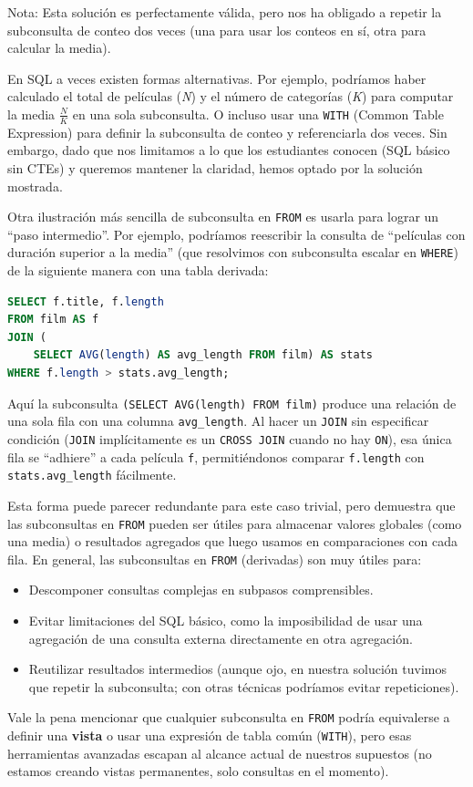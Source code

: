 \documentclass[12pt,a4paper]{article}
\begin{document}
Nota: Esta solución es perfectamente válida, pero nos ha obligado a repetir la subconsulta de conteo dos veces (una para usar los conteos en sí, otra para calcular la media).


En SQL a veces existen formas alternativas.
%
Por ejemplo, podríamos haber calculado el total de películas (\textit{N}) y el número de categorías (\textit{K}) para computar la media $\frac{N}{K}$ en una sola subconsulta.
%
O incluso usar una \texttt{WITH} (Common Table Expression) para definir la subconsulta de conteo y referenciarla dos veces.
%
Sin embargo, dado que nos limitamos a lo que los estudiantes conocen (SQL básico sin CTEs) y queremos mantener la claridad, hemos optado por la solución mostrada.


Otra ilustración más sencilla de subconsulta en \texttt{FROM} es usarla para lograr un “paso intermedio”.
%
Por ejemplo, podríamos reescribir la consulta de “películas con duración superior a la media” (que resolvimos con subconsulta escalar en \texttt{WHERE}) de la siguiente manera con una tabla derivada: 


\begin{lstlisting}[language=SQL]
SELECT f.title, f.length
FROM film AS f
JOIN (
	SELECT AVG(length) AS avg_length FROM film) AS stats
WHERE f.length > stats.avg_length;
\end{lstlisting}


Aquí la subconsulta \texttt{(SELECT AVG(length) FROM film)} produce una relación de una sola fila con una columna \texttt{avg\_length}.
%
Al hacer un \texttt{JOIN} sin especificar condición (\texttt{JOIN} implícitamente es un \texttt{CROSS JOIN} cuando no hay \texttt{ON}), esa única fila se “adhiere” a cada película \texttt{f}, permitiéndonos comparar \texttt{f.length} con \texttt{stats.avg\_length} fácilmente.

Esta forma puede parecer redundante para este caso trivial, pero demuestra que las subconsultas en \texttt{FROM} pueden ser útiles para almacenar valores globales (como una media) o resultados agregados que luego usamos en comparaciones con cada fila.
%
En general, las subconsultas en \texttt{FROM} (derivadas) son muy útiles para:



\begin{itemize}
\item Descomponer consultas complejas en subpasos comprensibles.
\item Evitar limitaciones del SQL básico, como la imposibilidad de usar una agregación de una consulta externa directamente en otra agregación.
\item Reutilizar resultados intermedios (aunque ojo, en nuestra solución tuvimos que repetir la subconsulta; con otras técnicas podríamos evitar repeticiones).
\end{itemize} 
Vale la pena mencionar que cualquier subconsulta en \texttt{FROM} podría equivalerse a definir una \textbf{vista} o usar una expresión de tabla común (\texttt{WITH}), pero esas herramientas avanzadas escapan al alcance actual de nuestros supuestos (no estamos creando vistas permanentes, solo consultas en el momento). 
\end{document}
